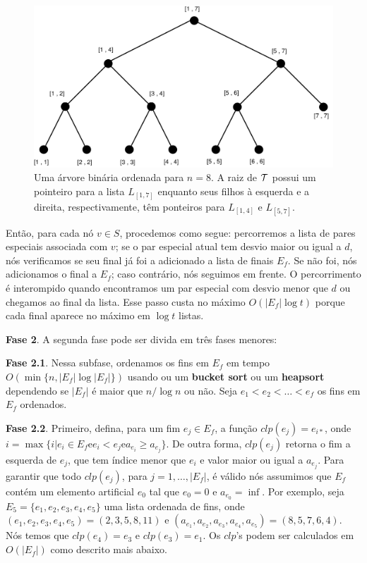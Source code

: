 \documentclass[12pt]{article}
\begin{document}
\begin{figure}[htp]
\begin{center}
\includegraphics[scale=0.2]{arvore.pdf}
\caption{Uma árvore binária ordenada para $n = 8$. A raiz de ${\cal T}$ possui um pointeiro para a lista $L_{[1,7]}$ enquanto seus filhos à esquerda 
e a direita, respectivamente, têm ponteiros para $L_{[1,4]}$ e $L_{[5,7]}$. }
\label{fig:binary_tree}
\end{center}
\end{figure}

Então, para cada nó $v \in S$,  procedemos como segue: percorremos a lista de pares especiais associada
com $v$; se o par especial atual tem desvio maior ou igual a $d$, nós verificamos se seu final já foi a adicionado a lista de finais $E_f$. Se não foi, nós adicionamos o final a $E_f$; caso contrário, nós seguimos
em frente. O percorrimento é interompido quando encontramos um par especial com desvio menor que $d$
ou chegamos ao final da lista. Esse passo custa no máximo $O(|E_f| \log t)$ porque cada final aparece no máximo
em $\log t$ listas.

\textbf{Fase 2}. A segunda fase pode ser divida em três fases menores:

\textbf{Fase 2.1}. Nessa subfase, ordenamos os fins em $E_f$ em tempo $O(\min\{n, |E_f|\log|E_f|\})$  
usando ou um \textbf{bucket sort} ou um \textbf{heapsort} dependendo se $|E_f|$ é maior que $n/\log n$ ou
não. Seja $e_1 < e_2 < \ldots < e_f$ os fins em $E_f$ ordenados.

\textbf{Fase 2.2}. Primeiro, defina, para um fim $e_j \in E_f$, a função $clp(e_j) = e_{i*}$,
onde $i = \max\{i|e_i \in E_f \text{e} e_i < e_j \text{e} a_{e_i} \ge a_{e_j}\}$. De outra forma,
$clp(e_j)$ retorna o fim a esquerda de $e_j$, que tem índice menor que $e_i$ e valor maior ou 
igual a $a_{e_j}$. Para garantir que todo $clp(e_j)$, para $j = 1, \ldots, |E_f|$, é válido nós
assumimos que $E_f$ contém um elemento artificial $e_0$ tal que $e_0 = 0$ e $a_{e_0} = \inf$.
Por exemplo, seja $E_5 = \{e_1, e_2, e_3, e_4, e_5\}$ uma lista ordenada de fins, onde 
$(e_1, e_2, e_3, e_4, e_5) = (2,3,5,8, 11)$ e $(a_{e_1}, a_{e_2}, a_{e_3}, a_{e_4}, a_{e_5}) = (8,5,7,6,4)$.
Nós temos que $clp(e_4) = e_3$ e $clp(e_3) = e_1$. Os $clp$'s podem ser calculados em $O(|E_f|)$ como
descrito mais abaixo. 
\end{document}
